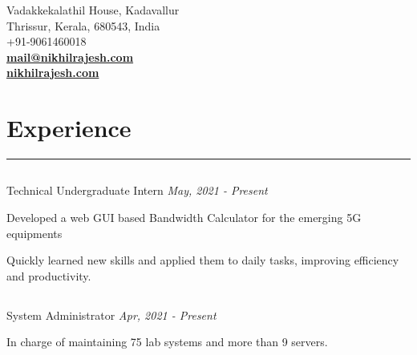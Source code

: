 \documentclass[]{resume}
\begin{document}
\begin{minipage}[t]{0.66\textwidth} 
\vspace{10pt}
\hspace*{0pt}\hfill Vadakkekalathil House, Kadavallur \\
\hspace*{0pt}\hfill Thrissur, Kerala, 680543, India \\
\hspace*{0pt}\hfill +91-9061460018 \\
\hspace*{0pt}\hfill \textbf{\href{mailto:mail@nikhilrajesh.com}{mail@nikhilrajesh.com}} \\
\hspace*{0pt}\hfill \textbf{\href{http://nikhilrajesh.com}{nikhilrajesh.com}} 

\vspace{9.4pt}
\section{Experience}
\noindent\rule{12.5cm}{0.8pt}
\subsection{\href{https://cisco.com}{}}
\noindent Technical Undergraduate Intern \hfill \emph{May, 2021 - Present}
\vspace{1mm}
\begin{tightemize}
    \item Developed a web GUI based Bandwidth Calculator for the emerging 5G equipments
    \item Quickly learned new skills and applied them to daily tasks, improving efficiency
and productivity.
\end{tightemize}
\sectionsep

\subsection{}
\noindent System Administrator \hfill \emph{Apr, 2021 - Present}
\vspace{1mm}
\begin{tightemize}
    \item In charge of maintaining 75 lab systems and more than 9 servers.
\end{tightemize}
\sectionsep


\end{minipage}
\end{document}
